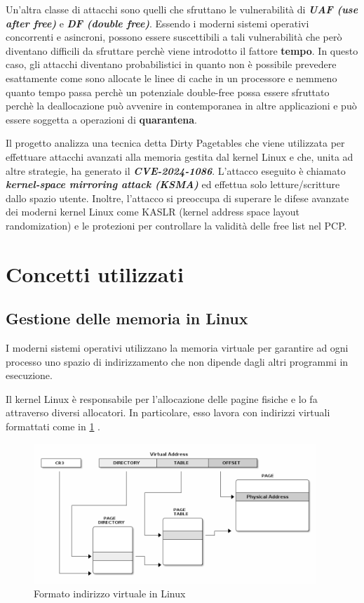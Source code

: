 \documentclass{article}
\begin{document}
Un'altra classe di attacchi sono quelli che sfruttano le vulnerabilità di \textbf{\textit{UAF (use after free)}} e 
\textbf{\textit{DF (double free)}}. Essendo i moderni sistemi operativi
concorrenti e asincroni, possono essere suscettibili a tali vulnerabilità che però diventano 
difficili da sfruttare perchè viene introdotto il fattore \textbf{tempo}. In questo caso, 
gli attacchi diventano probabilistici in quanto non è possibile prevedere esattamente come 
sono allocate le linee di cache in un processore e nemmeno quanto tempo passa perchè un
potenziale double-free possa essere sfruttato perchè la deallocazione può avvenire in 
contemporanea in altre applicazioni e può essere soggetta a operazioni di \textbf{quarantena}. 

Il progetto analizza una tecnica detta Dirty Pagetables che viene utilizzata per effettuare 
attacchi avanzati alla memoria gestita dal kernel Linux e che, unita ad altre strategie, ha 
generato il \textbf{\textit{CVE-2024-1086}}. L'attacco eseguito è chiamato 
\textbf{\textit{kernel-space mirroring attack (KSMA)}} ed effettua solo letture/scritture 
dallo spazio utente. Inoltre, l'attacco si preoccupa di superare le difese avanzate dei 
moderni kernel Linux come KASLR (kernel address space layout randomization) e le protezioni per 
controllare la validità delle free list nel PCP.

\clearpage
\section{Concetti utilizzati}\label{s:basics}
\subsection{Gestione delle memoria in Linux}
I moderni sistemi operativi utilizzano la memoria virtuale per garantire ad ogni processo 
uno spazio di indirizzamento che non dipende dagli altri programmi in esecuzione. 

Il kernel Linux è responsabile per l'allocazione delle pagine fisiche e lo fa attraverso 
diversi allocatori. In particolare, esso lavora con indirizzi virtuali formattati come 
in \cref{fig:linux_va} \cite{LinuxDocs}.

\begin{figure}[h]
  \begin{center}
    \includegraphics[width=0.95\textwidth]{figures/ch1/linux_va.png}
  \end{center}
  \caption{Formato indirizzo virtuale in Linux}\label{fig:linux_va}
\end{figure}
\end{document}
